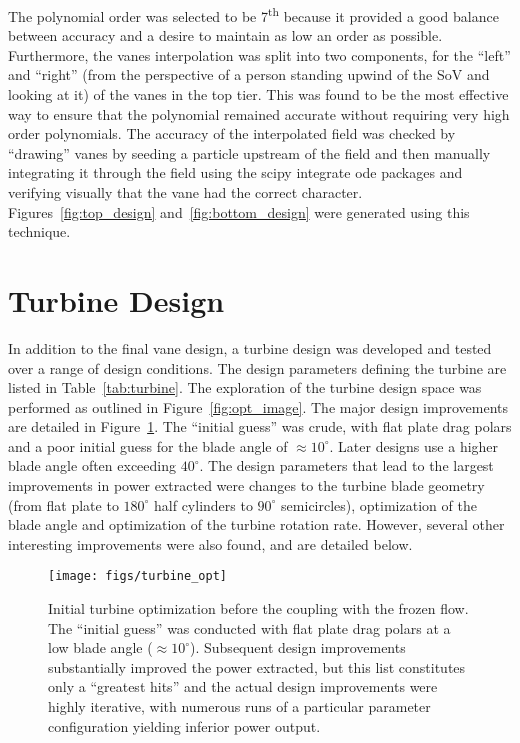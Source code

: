 The polynomial order was selected to be 7\textsuperscript{th} because it
provided a good balance between accuracy and a desire to maintain as low
an order as possible. Furthermore, the vanes interpolation was split
into two components, for the ``left'' and ``right'' (from the perspective of a
person standing upwind of the SoV and looking at it) of the vanes in the
top tier. This was found to be the most effective way to ensure that the
polynomial remained accurate without requiring very high order
polynomials. The accuracy of the interpolated field was checked by
``drawing'' vanes by seeding a particle upstream of the field and then
manually integrating it through the field using the scipy integrate ode
packages and verifying visually that the vane had the correct
character. Figures~\ref{fig:top_design} and~\ref{fig:bottom_design} were
generated using this technique. 

%
%

\section{Turbine Design}
\label{sec:turb_design}

In addition to the final vane design, a turbine design was developed and
tested over a range of design conditions. The design parameters defining
the turbine are listed in Table~\ref{tab:turbine}. The exploration of the
turbine design space was performed as outlined in
Figure~\ref{fig:opt_image}. The major design improvements are detailed
in Figure~\ref{fig:ut_turbine}. The ``initial guess'' was crude, with
flat plate drag polars and a poor 
initial guess for the blade angle of $\approx 10^{\circ}$. Later
designs use a higher blade angle often exceeding $40^{\circ}$. 
The design parameters that lead to the largest improvements in power
extracted were changes to the turbine blade geometry (from flat plate to
$180^{\circ}$ half cylinders to $90^{\circ}$ semicircles), optimization
of the blade angle and optimization of the turbine rotation rate. 
However, several other interesting improvements were also found, and are
detailed below.  

  \begin{figure}[!htb]
   \begin{center}
    \texttt{[image: figs/turbine\_opt]}
    \caption{Initial turbine optimization before the coupling with the
    frozen flow. The ``initial guess'' was conducted with flat plate
    drag polars at a low blade angle ($\approx
    10^{\circ}$). Subsequent design improvements substantially improved  
    the power extracted, but this list constitutes only a ``greatest
    hits'' and the actual design improvements were highly iterative,
    with numerous runs of a particular parameter configuration yielding
    inferior power output. }
    \label{fig:ut_turbine}
   \end{center}
  \end{figure}

